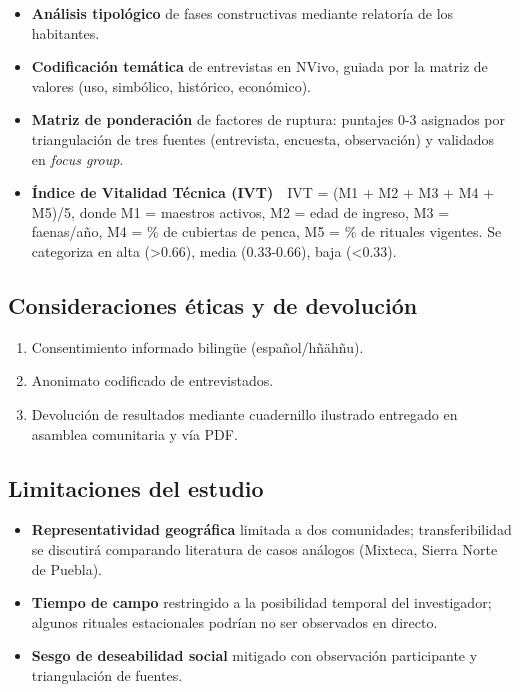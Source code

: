 \begin{itemize}
	\item \textbf{Análisis tipológico} de fases constructivas mediante relatoría de los habitantes.
	\item \textbf{Codificación temática} de entrevistas en NVivo, guiada
	      por la matriz de valores (uso, simbólico, histórico, económico).
	\item \textbf{Matriz de ponderación} de factores de ruptura:
	      puntajes 0-3 asignados por triangulación de tres fuentes
	      (entrevista, encuesta, observación) y validados en
	      \textit{focus group}.
	\item \textbf{Índice de Vitalidad Técnica (IVT)} IVT =
	      (M1 + M2 + M3 + M4 + M5)/5, donde
	      M1 = maestros activos,
	      M2 = edad de ingreso,
	      M3 = faenas/año,
	      M4 = \% de cubiertas de penca,
	      M5 = \% de rituales vigentes.
	      Se categoriza en alta (\textgreater0.66), media (0.33-0.66),
	      baja (\textless0.33).
\end{itemize}

\subsection{Consideraciones éticas y de devolución}

\begin{enumerate}
	\item Consentimiento informado bilingüe (español/hñähñu).
	\item Anonimato codificado de entrevistados.
	\item Devolución de resultados mediante cuadernillo ilustrado
	      entregado en asamblea comunitaria y vía PDF.
\end{enumerate}

\subsection{Limitaciones del estudio}

\begin{itemize}
	\item \textbf{Representatividad geográfica} limitada a dos comunidades;
	      transferibilidad se discutirá comparando literatura de casos
	      análogos (Mixteca, Sierra Norte de Puebla).
	\item \textbf{Tiempo de campo} restringido a la posibilidad temporal del investigador;
	      algunos rituales estacionales podrían no ser observados en directo.
	\item \textbf{Sesgo de deseabilidad social} mitigado con observación
	      participante y triangulación de fuentes.
\end{itemize}

